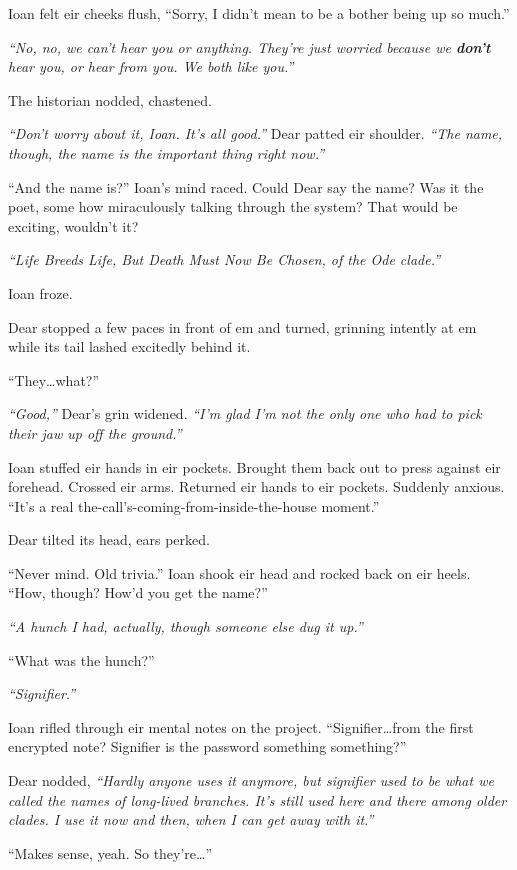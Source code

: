 Ioan felt eir cheeks flush, ``Sorry, I didn't mean to be a bother being up so much.''

\emph{``No, no, we can't hear you or anything. They're just worried because we \textbf{don't} hear you, or hear from you. We both like you.''}

The historian nodded, chastened.

\emph{``Don't worry about it, Ioan. It's all good.''} Dear patted eir shoulder. \emph{``The name, though, the name is the important thing right now.''}

``And the name is?'' Ioan's mind raced. Could Dear say the name? Was it the poet, some how miraculously talking through the system? That would be exciting, wouldn't it?

\emph{``Life Breeds Life, But Death Must Now Be Chosen, of the Ode clade.''}

Ioan froze.

Dear stopped a few paces in front of em and turned, grinning intently at em while its tail lashed excitedly behind it.

``They\ldots{}what?''

\emph{``Good,''} Dear's grin widened. \emph{``I'm glad I'm not the only one who had to pick their jaw up off the ground.''}

Ioan stuffed eir hands in eir pockets. Brought them back out to press against eir forehead. Crossed eir arms. Returned eir hands to eir pockets. Suddenly anxious. ``It's a real the-call's-coming-from-inside-the-house moment.''

Dear tilted its head, ears perked.

``Never mind. Old trivia.'' Ioan shook eir head and rocked back on eir heels. ``How, though? How'd you get the name?''

\emph{``A hunch I had, actually, though someone else dug it up.''}

``What was the hunch?''

\emph{``Signifier.''}

Ioan rifled through eir mental notes on the project. ``Signifier\ldots{}from the first encrypted note? Signifier is the password something something?''

Dear nodded, \emph{``Hardly anyone uses it anymore, but signifier used to be what we called the names of long-lived branches. It's still used here and there among older clades. I use it now and then, when I can get away with it.''}

``Makes sense, yeah. So they're\ldots{}''

